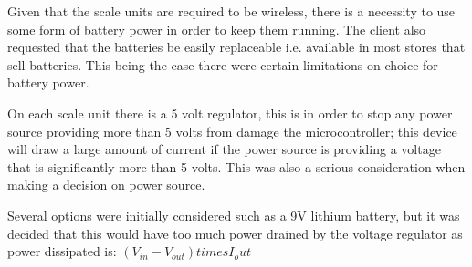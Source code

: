 Given that the scale units are required to be wireless, there is a necessity to use some form of battery power in order to keep them running. The client also requested that the batteries be easily replaceable i.e. available in most stores that sell batteries. This being the case there were certain limitations on choice for battery power. 

On each scale unit there is a 5 volt regulator, this is in order to stop any power source providing more than 5 volts from damage the microcontroller; this device will draw a large amount of current if the power source is providing a voltage that is significantly more than 5 volts. This was also a serious consideration when making a decision on power source.

Several options were initially considered such as a 9V lithium battery, but it was decided that this would have too much power drained by the voltage regulator as power dissipated is: $(V_{in} - V_{out}) times I_out$